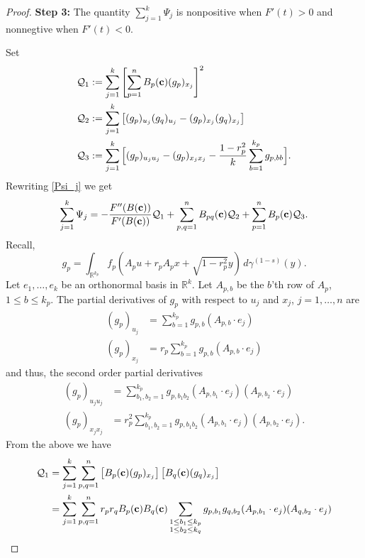 \documentclass[9pt, a4paper]{amsart}
\newcommand{\1}{{\chi_{}}}%
\numberwithin{equation}{section}
\begin{document}
\begin{proof}
{\textbf{Step 3:}} The quantity $\sum_{j=1}^k\Psi_j$ is nonpositive  when $F'(t)>0$ and nonnegtive when $F'(t)<0$.

\vspace{0.2cm}


Set 
\begin{align*}
	\mathcal{Q}_1&:=\sum_{j=1}^k\left[\sum_{p=1}^n B_{p}({\bf{c}})(g_p)_{x_j}\right]^2\\
	\mathcal{Q}_2&:=\sum_{j=1}^k\left[(g_p)_{u_j}(g_q)_{u_j}-(g_p)_{x_j}(g_q)_{x_j}\right]\\
	\mathcal{Q}_3&:= \sum_{j=1}^k\Big[(g_p)_{u_ju_j}-(g_p)_{x_jx_j}-\frac{1-r_p^2}{k}\sum_{b=1}^{k_p}g_{p,bb}\Big].
\end{align*}
Rewriting \eqref{Psi_j} we get
\begin{equation}\label{sumPsi}
	\sum_{j=1}^k\Psi_j=-\frac{F''(B({\bf{c}}))}{F'(B({\bf{c}}))}\mathcal{Q}_1+\sum_{p,q=1}^{n}B_{pq}({\bf{c}})\mathcal{Q}_2+\sum_{p=1}^nB_p({\bf{c}})\mathcal{Q}_3.
\end{equation}
Recall, 
\begin{equation}\label{g_p}
	g_p = \int_{\mathbb{R}^{k_p}} f_p(A_p u + r_p A_p x + \sqrt{1 - r_p^2} y) \, d\gamma^{(1-s)}(y).
\end{equation}
Let $ e_1, \ldots, e_k $ be an orthonormal basis in $ \mathbb{R}^k $. Let $A_{p,b}$ be the $b$'th row of $A_p$, $1\leq b\leq k_p$. The partial derivatives of $g_p$ with respect to $u_j$ and $x_j$, $j=1,\ldots,n$ are
\begin{align*}		(g_p)_{u_j}&=\sum_{b=1}^{k_p}g_{p,b}(A_{p,b}\cdot e_j)\\
	(g_p)_{x_j}&=r_p \sum_{b=1}^{k_p}g_{p,b}(A_{p,b}\cdot e_j)
\end{align*}
and thus, the second order partial derivatives
\begin{align*}
	(g_p)_{u_ju_j}&=\sum_{b_1, b_2=1}^{k_p}g_{p,b_1b_2}(A_{p,b_1}\cdot e_j)(A_{p,b_2}\cdot e_j)\\
	(g_p)_{x_jx_j}&=r_p^2\sum_{b_1, b_2=1}^{k_p}g_{p,b_1b_2}(A_{p,b_1}\cdot e_j)(A_{p,b_2}\cdot e_j).
\end{align*}
From the above we have
\begin{align*}
\mathcal{Q}_1&=\sum_{j=1}^k\sum_{p,q=1}^{n}\left[B_{p}({\bf{c}})(g_p)_{x_j} \right] \left[B_{q}({\bf{c}})(g_q)_{x_j} \right]\\
  &=\sum_{j=1}^k\sum_{p,q=1}^{n}r_p r_q  B_{p}({\bf{c}}) B_{q}({\bf{c}})\sum_{\substack{1\leq b_1\leq k_p \\ 1\leq b_2\leq k_q}} g_{p,b_1} g_{q,b_2}(A_{p,b_1}\cdot e_j) (A_{q,b_2}\cdot e_j)\\

\end{align*}
\end{proof}
\end{document}
